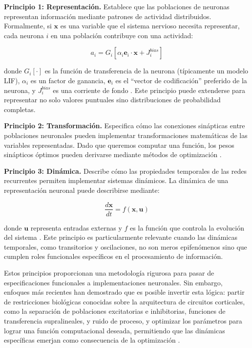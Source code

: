 \textbf{Principio 1: Representación.} Establece que las poblaciones de neuronas representan información mediante patrones de actividad distribuidos. Formalmente, si $\mathbf{x}$ es una variable que el sistema nervioso necesita representar, cada neurona $i$ en una población contribuye con una actividad:

\begin{equation}
a_i = G_i[\alpha_i \mathbf{e}_i \cdot \mathbf{x} + J_i^{bias}]
\label{eq:neural_encoding}
\end{equation}

donde $G_i[\cdot]$ es la función de transferencia de la neurona (típicamente un modelo LIF), $\alpha_i$ es un factor de ganancia, $\mathbf{e}_i$ es el ``vector de codificación'' preferido de la neurona, y $J_i^{bias}$ es una corriente de fondo \citep{eliasmith2003neural}. Este principio puede extenderse para representar no solo valores puntuales sino distribuciones de probabilidad completas.

\textbf{Principio 2: Transformación.} Especifica cómo las conexiones sinápticas entre poblaciones neuronales pueden implementar transformaciones matemáticas de las variables representadas. Dado que queremos computar una función, los pesos sinápticos óptimos pueden derivarse mediante métodos de optimización \citep{eliasmith2003neural}.

\textbf{Principio 3: Dinámica.} Describe cómo las propiedades temporales de las redes recurrentes permiten implementar sistemas dinámicos. La dinámica de una representación neuronal puede describirse mediante:

\begin{equation}
\frac{d\mathbf{x}}{dt} = f(\mathbf{x}, \mathbf{u})
\label{eq:neural_dynamics}
\end{equation}

donde $\mathbf{u}$ representa entradas externas y $f$ es la función que controla la evolución del sistema \citep{eliasmith2003neural}. Este principio es particularmente relevante cuando las dinámicas temporales, como transitorios y oscilaciones, no son meros epifenómenos sino que cumplen roles funcionales específicos en el procesamiento de información.

Estos principios proporcionan una metodología rigurosa para pasar de especificaciones funcionales a implementaciones neuronales. Sin embargo, enfoques más recientes han demostrado que es posible invertir esta lógica: partir de restricciones biológicas conocidas sobre la arquitectura de circuitos corticales, como la separación de poblaciones excitatorias e inhibitorias, funciones de transferencia supralineales, y ruido de proceso, y optimizar los parámetros para lograr una función computacional deseada, permitiendo que las dinámicas específicas emerjan como consecuencia de la optimización \citep{echeveste2020cortical}.


